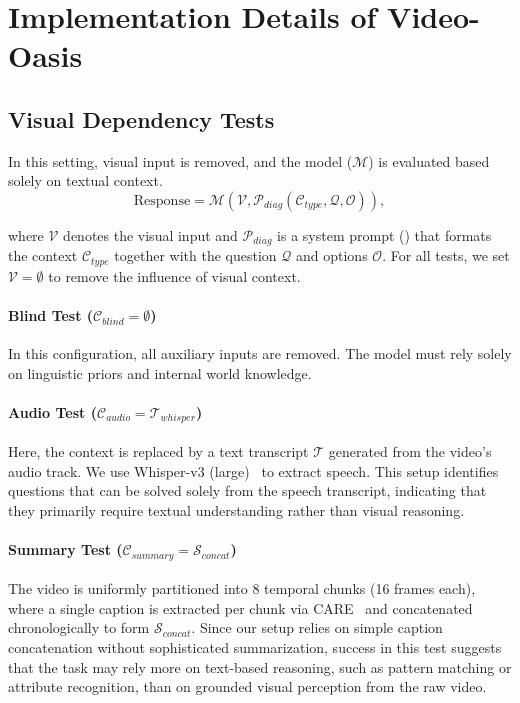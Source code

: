 \section{Implementation Details of Video-Oasis} \label{sec:c}

    \subsection{Visual Dependency Tests}
        In this setting, visual input is removed, and the model ($\mathcal{M}$) is evaluated based solely on textual context. 
        \begin{equation}
            \text{Response} = \mathcal{M}\left( \mathcal{V}, \mathcal{P}_{diag}(\mathcal{C}_{type}, \mathcal{Q}, \mathcal{O}) \right),
        \end{equation}
        
        \noindent where $\mathcal{V}$ denotes the visual input and $\mathcal{P}_{diag}$ is a system prompt () that formats the context $\mathcal{C}_{type}$ together with the question $\mathcal{Q}$ and options $\mathcal{O}$. For all tests, we set $\mathcal{V} = \emptyset$ to remove the influence of visual context.
        
        \paragraph{\textbf{Blind Test ($\mathcal{C}_{blind} = \emptyset$)}}
        In this configuration, all auxiliary inputs are removed. 
        The model must rely solely on linguistic priors and internal world knowledge.
        
        \paragraph{\textbf{Audio Test ($\mathcal{C}_{audio} = \mathcal{T}_{whisper}$)}} 
        Here, the context is replaced by a text transcript $\mathcal{T}$ generated from the video's audio track. 
        We use Whisper-v3 (large)~\cite{whisper} to extract speech. 
        This setup identifies questions that can be solved solely from the speech transcript, indicating that they primarily require textual understanding rather than visual reasoning.
        
        \paragraph{\textbf{Summary Test ($\mathcal{C}_{summary} = \mathcal{S}_{concat}$)}} 
        The video is uniformly partitioned into 8 temporal chunks (16 frames each), where a single caption is extracted per chunk via CARE~\cite{care} and concatenated chronologically to form $\mathcal{S}_{concat}$. 
        Since our setup relies on simple caption concatenation without sophisticated summarization, success in this test suggests that the task may rely more on text-based reasoning, such as pattern matching or attribute recognition, than on grounded visual perception from the raw video.

